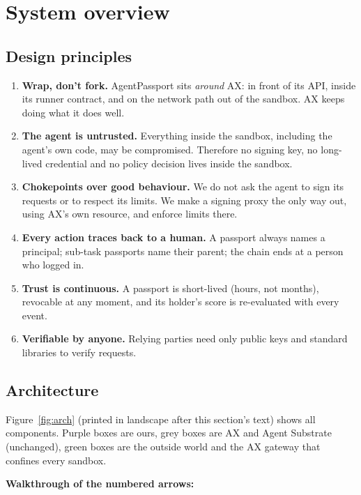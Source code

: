 \section{System overview}\label{sec:overview}

\subsection{Design principles}

\begin{enumerate}
  \item \textbf{Wrap, don't fork.} AgentPassport sits \emph{around} AX: in front of its API, inside its runner contract, and on the network path out of the sandbox. AX keeps doing what it does well.
  \item \textbf{The agent is untrusted.} Everything inside the sandbox, including the agent's own code, may be compromised. Therefore no signing key, no long-lived credential and no policy decision lives inside the sandbox.
  \item \textbf{Chokepoints over good behaviour.} We do not ask the agent to sign its requests or to respect its limits. We make a signing proxy the only way out, using AX's own  resource, and enforce limits there.
  \item \textbf{Every action traces back to a human.} A passport always names a principal; sub-task passports name their parent; the chain ends at a person who logged in.
  \item \textbf{Trust is continuous.} A passport is short-lived (hours, not months), revocable at any moment, and its holder's score is re-evaluated with every event.
  \item \textbf{Verifiable by anyone.} Relying parties need only public keys and standard libraries to verify requests.
\end{enumerate}

\subsection{Architecture}

Figure~\ref{fig:arch} (printed in landscape after this section's text) shows all components. Purple boxes are ours, grey boxes are AX and Agent Substrate (unchanged), green boxes are the outside world and the AX gateway that confines every sandbox.



\textbf{Walkthrough of the numbered arrows:}


